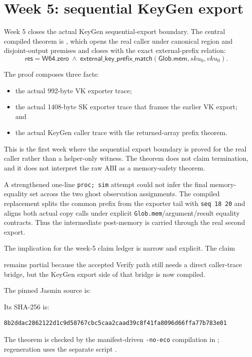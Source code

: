 \section{Week 5: sequential KeyGen export}

Week 5 closes the actual KeyGen sequential-export boundary.  The central
compiled theorem is
,
which opens the real
 caller under canonical
region and disjoint-output premises and closes with the exact external-prefix
relation:
\[
  \mathsf{res} = \mathsf{W64.zero}
  \;\land\;
  \mathsf{external\_key\_prefix\_match}(\mathsf{Glob.mem},sku_0,vku_0).
\]

The proof composes three facts:

\begin{itemize}
  \item the actual 992-byte VK exporter trace;
  \item the actual 1408-byte SK exporter trace that frames the earlier VK
    export; and
  \item the actual KeyGen caller trace with the returned-array prefix theorem.
\end{itemize}

This is the first week where the sequential export boundary is proved for the
real caller rather than a helper-only witness.  The theorem does not claim
termination, and it does not interpret the raw ABI as a memory-safety
theorem.

A strengthened one-line \texttt{proc; sim} attempt could not infer the final
memory-equality set across the two ghost observation assignments.  The
compiled replacement splits the common prefix from the exporter tail with
\texttt{seq 18 20} and aligns both actual copy calls under explicit
\texttt{Glob.mem}/argument/result equality contracts.  Thus the intermediate
post-memory is carried through the real second export.

The implication for the week-5 claim ledger is narrow and explicit.  The claim
\begin{quote}
\end{quote}
remains partial because the accepted Verify path still needs a direct
caller-trace bridge, but the KeyGen export side of that bridge is now compiled.

The pinned Jasmin source is:
\begin{quote}
\end{quote}
Its SHA-256 is:
\begin{verbatim}
8b2ddac2862122d1c9d58767cbc5caa2caad39c8f41fa8096d66ffa77b783e01
\end{verbatim}
The theorem is checked by the manifest-driven \texttt{-no-eco} compilation in
; regeneration uses the separate script
.
